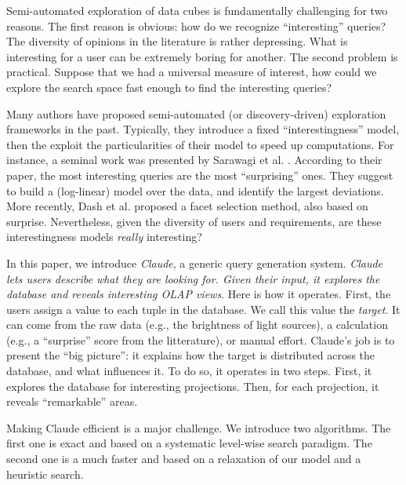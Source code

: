 Semi-automated exploration of data cubes is fundamentally challenging for two
reasons. The first reason is obvious: how do we recognize ``interesting''
queries?  The diversity of opinions in the literature is rather depressing.
What is interesting for a user can be extremely boring for another. The second
problem is practical.  Suppose that we had a universal measure of interest, how
could we explore the search space fast enough to find the interesting queries?

Many authors have proposed semi-automated (or discovery-driven) exploration
frameworks in the past. Typically, they introduce a fixed ``interestingness''
model, then the exploit the particularities of their model to speed up
computations.  For instance, a seminal work was presented by Sarawagi et al.
\cite{sarawagi1998discovery}. According to their paper, the most interesting
queries are the most ``surprising'' ones.  They suggest to build a (log-linear)
model over the data, and identify the largest deviations. More recently, Dash
et al.\cite{dash2008dynamic} proposed a facet selection method, also based on
surprise. Nevertheless, given the diversity of users and requirements, are
these interestingness models \emph{really} interesting?

In this paper, we introduce \textit{Claude}, a generic query generation
system. \emph{Claude lets users describe what they are looking for.
Given their input, it explores the database and reveals interesting OLAP views}.
Here is how it operates. First, the users assign a value to each tuple in
the database.  We call this value the \emph{target}. It can come from the raw
data (e.g., the brightness of light sources), a calculation (e.g., a
``surprise'' score from the litterature), or manual effort. Claude's job is to
present the ``big picture'': it explains how the target is distributed across
the database, and what influences it. To do so, it operates in two steps.
First, it explores the database for interesting projections. Then, for each
projection, it reveals ``remarkable'' areas. 

Making Claude efficient is a major challenge. We
introduce two algorithms.  The first one is exact and based on a systematic
level-wise search paradigm.  The second one is a much faster and based on a
relaxation of our model and a heuristic search.
